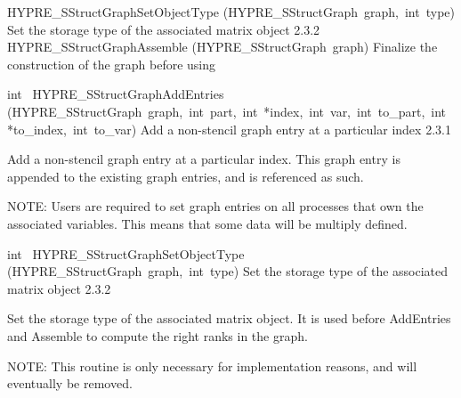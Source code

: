 \documentclass{article}
\begin{document}
\begin{cxxentry}
\begin{cxxentry}
\begin{cxxnames}
        {HYPRE\_SStructGraphSetObjectType}
        {(HYPRE\_SStructGraph\ graph,\ int\ type)}
        {
Set the storage type of the associated matrix object}
        {2.3.2}
        {HYPRE\_SStructGraphAssemble}
        {(HYPRE\_SStructGraph\ graph)}
        {
Finalize the construction of the graph before using}
        {}
\label{cxx.2.3.7}
\end{cxxnames}
\begin{cxxfunction}
{int\ }
        {HYPRE\_SStructGraphAddEntries}
        {(HYPRE\_SStructGraph\ graph,\ int\ part,\ int\ *index,\ int\ var,\ int\ to\_part,\ int\ *to\_index,\ int\ to\_var)}
        {
Add a non-stencil graph entry at a particular index}
        {2.3.1}
\begin{cxxdoc}

Add a non-stencil graph entry at a particular index.  This graph entry is
appended to the existing graph entries, and is referenced as such.

NOTE: Users are required to set graph entries on all processes that own the
associated variables.  This means that some data will be multiply defined.
\end{cxxdoc}
\end{cxxfunction}
\begin{cxxfunction}
{int\ }
        {HYPRE\_SStructGraphSetObjectType}
        {(HYPRE\_SStructGraph\ graph,\ int\ type)}
        {
Set the storage type of the associated matrix object}
        {2.3.2}
\begin{cxxdoc}

Set the storage type of the associated matrix object.  It is used before
AddEntries and Assemble to compute the right ranks in the graph.

NOTE: This routine is only necessary for implementation reasons, and will
eventually be removed.



\end{cxxdoc}
\end{cxxfunction}
\end{cxxentry}
\end{cxxentry}
\end{document}
